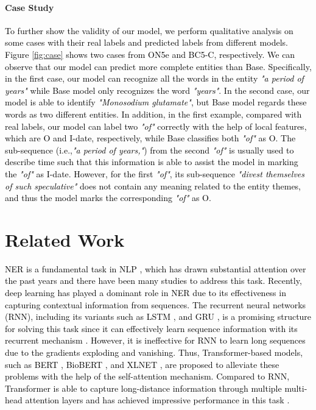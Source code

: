 \documentclass[11pt]{article}
\begin{document}
\paragraph{Case Study}
\textcolor{black}{
To further show the validity of our model, we perform qualitative analysis on some cases with their real labels and predicted labels from different models.
Figure \ref{fig:case} shows two cases from ON5e and BC5-C, respectively.
\textcolor{black}{We can observe that our model can predict more complete entities than Base. 
Specifically, in the first case, our model can recognize all the words in the entity \textit{"a period of years"} while Base model only recognizes the word \textit{"years"}.
In the second case, our model is able to identify \textit{"Monosodium glutamate"}, but Base model regards these words as two different entities.}
In addition, in the first example, compared with real labels, our model can label two \textit{"of"} correctly with the help of local features, which are O and I-date, respectively, while Base classifies both \textit{"of"} as O.
The sub-sequence (i.e.,\textit{"a period of years,"}) from the second \textit{"of"} is usually used to describe time such that this information is able to assist the model in marking the \textit{"of"} as I-date.
However, for the first \textit{"of"}, its sub-sequence \textit{"divest themselves of such speculative"} does not contain any meaning related to the entity themes, and thus the model marks the corresponding \textit{"of"} as O.
}

\section{Related Work}
\textcolor{black}{
NER is a fundamental task in NLP \cite{huang2015bidirectional}, which has drawn substantial attention over the past years and there have been many studies to address this task.
Recently, deep learning has played a dominant role in NER due to its effectiveness in capturing contextual information from sequences.
The recurrent neural networks (RNN), including its variants such as LSTM \cite{hochreiter1997long}, and GRU \cite{GRU}, is a promising structure for solving this task since it can effectively learn sequence information with its recurrent mechanism \cite{ma2016end, huang2015bidirectional, chiu2016named, zhu2019can}.
However, it is ineffective for RNN to learn long sequences due to the gradients exploding and vanishing.
Thus, Transformer-based models, such as BERT \cite{BERT}, BioBERT \cite{biobert}, and XLNET \cite{yangxlnet}, are proposed to alleviate these problems with the help of the self-attention mechanism.
Compared to RNN, Transformer is able to capture long-distance information through multiple multi-head attention layers and has achieved impressive performance in this task \cite{nie2020named,luo2020hierarchical,yamada2020luke, gui2019lexicon}.
}
\end{document}
